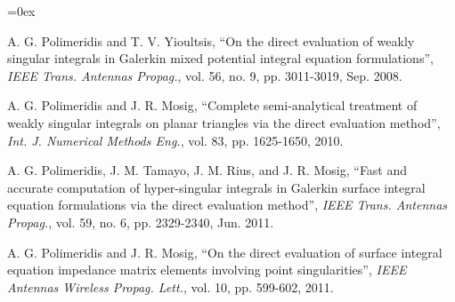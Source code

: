 \documentclass[a4wide,11pt]{article}
\begin{document}
\begin{thebibliography}{9}
\itemsep=0ex

 A. G. Polimeridis and T. V. Yioultsis, ``On the direct evaluation of weakly singular integrals in Galerkin mixed potential integral equation formulations'', \textit{IEEE Trans. Antennas Propag.}, vol. 56, no. 9, pp. 3011-3019, Sep. 2008.

 A. G. Polimeridis and J. R. Mosig, ``Complete semi-analytical treatment of weakly singular integrals on planar triangles via the direct evaluation method'', \textit{Int. J. Numerical Methods Eng.}, vol. 83, pp. 1625-1650, 2010.

 A. G. Polimeridis, J. M. Tamayo, J. M. Rius, and J. R. Mosig, ``Fast and accurate computation of hyper-singular integrals in Galerkin surface integral equation formulations via the direct evaluation method'', \textit{IEEE Trans. Antennas Propag.}, vol. 59, no. 6, pp. 2329-2340, Jun. 2011.

 A. G. Polimeridis and J. R. Mosig, ``On the direct evaluation of surface integral equation impedance matrix elements involving point singularities'', \textit{IEEE Antennas Wireless Propag. Lett.}, vol. 10, pp. 599-602, 2011.

\end{thebibliography}
\end{document}
